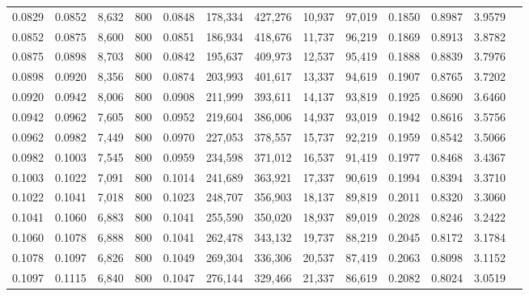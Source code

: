 \begin{tabular}{rrrrrrrrrrrrr}
0.0829 & 0.0852 &  8,632 & 800 &                                     0.0848 & 178,334 & 427,276 &  10,937 &  97,019 & 0.1850 & 0.8987 & 3.9579 \\
0.0852 & 0.0875 &  8,600 & 800 &                                     0.0851 & 186,934 & 418,676 &  11,737 &  96,219 & 0.1869 & 0.8913 & 3.8782 \\
0.0875 & 0.0898 &  8,703 & 800 &                                     0.0842 & 195,637 & 409,973 &  12,537 &  95,419 & 0.1888 & 0.8839 & 3.7976 \\
0.0898 & 0.0920 &  8,356 & 800 &                                     0.0874 & 203,993 & 401,617 &  13,337 &  94,619 & 0.1907 & 0.8765 & 3.7202 \\
0.0920 & 0.0942 &  8,006 & 800 &                                     0.0908 & 211,999 & 393,611 &  14,137 &  93,819 & 0.1925 & 0.8690 & 3.6460 \\
0.0942 & 0.0962 &  7,605 & 800 &                                     0.0952 & 219,604 & 386,006 &  14,937 &  93,019 & 0.1942 & 0.8616 & 3.5756 \\
0.0962 & 0.0982 &  7,449 & 800 &                                     0.0970 & 227,053 & 378,557 &  15,737 &  92,219 & 0.1959 & 0.8542 & 3.5066 \\
0.0982 & 0.1003 &  7,545 & 800 &                                     0.0959 & 234,598 & 371,012 &  16,537 &  91,419 & 0.1977 & 0.8468 & 3.4367 \\
0.1003 & 0.1022 &  7,091 & 800 &                                     0.1014 & 241,689 & 363,921 &  17,337 &  90,619 & 0.1994 & 0.8394 & 3.3710 \\
0.1022 & 0.1041 &  7,018 & 800 &                                     0.1023 & 248,707 & 356,903 &  18,137 &  89,819 & 0.2011 & 0.8320 & 3.3060 \\
0.1041 & 0.1060 &  6,883 & 800 &                                     0.1041 & 255,590 & 350,020 &  18,937 &  89,019 & 0.2028 & 0.8246 & 3.2422 \\
0.1060 & 0.1078 &  6,888 & 800 &                                     0.1041 & 262,478 & 343,132 &  19,737 &  88,219 & 0.2045 & 0.8172 & 3.1784 \\
0.1078 & 0.1097 &  6,826 & 800 &                                     0.1049 & 269,304 & 336,306 &  20,537 &  87,419 & 0.2063 & 0.8098 & 3.1152 \\
0.1097 & 0.1115 &  6,840 & 800 &                                     0.1047 & 276,144 & 329,466 &  21,337 &  86,619 & 0.2082 & 0.8024 & 3.0519 \\

\end{tabular}
